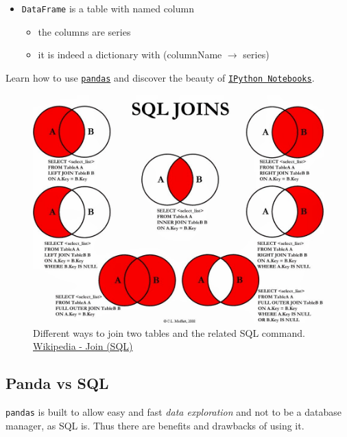 \begin{itemize} 
 \item \texttt{DataFrame} is a table with named column
  \begin{itemize}
  \item the columns are series
  \item it is indeed a dictionary with (columnName $\rightarrow$ series)
  \end{itemize}  
\end{itemize}

Learn how to use \href{https://github.com/ADAEPFL/Labs/tree/master/02\%20-\%20Intro\%20to\%20Pandas}{\texttt{pandas}} and discover the beauty of \href{https://github.com/ADAEPFL/Labs/tree/master/01\%20-\%20Intro\%20to\%20Tools}{\texttt{IPython Notebooks}}.

\begin{figure}%
 \centering
 \includegraphics[width=12cm]{./img/02/SQL_joins}
 \caption{\label{join_SQL} Different ways to join two tables and the related SQL command. \href{https://en.wikipedia.org/wiki/Join\_(SQL)}{Wikipedia - Join (SQL)}}
\end{figure}


\subsection{Panda vs SQL}

\texttt{pandas} is built to allow easy and fast \emph{data exploration} and not to be a database manager, as SQL is. Thus there are benefits and drawbacks of using it.


